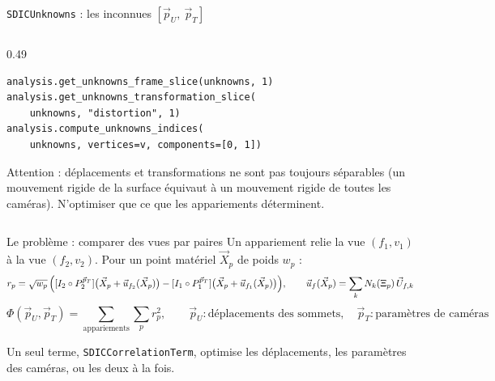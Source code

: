 \documentclass[aspectratio=169,11pt]{beamer}
\newcommand{\code}[1]{\texttt{\small #1}}
\newcommand{\cls}[1]{\textcolor{pyblue}{\texttt{#1}}}
\begin{document}
\begin{frame}[fragile]{\texttt{SDICUnknowns} : les inconnues $[\vec{p}_U,\ \vec{p}_T]$}
\begin{columns}[T]
\begin{column}{0.49\textwidth}
\begin{lstlisting}[basicstyle=\ttfamily\tiny]
analysis.get_unknowns_frame_slice(unknowns, 1)
analysis.get_unknowns_transformation_slice(
    unknowns, "distortion", 1)
analysis.compute_unknowns_indices(
    unknowns, vertices=v, components=[0, 1])
\end{lstlisting}
      \scriptsize \textcolor{pyred}{Attention :} déplacements et transformations ne
      sont pas toujours séparables (un mouvement rigide de la surface équivaut à un
      mouvement rigide de toutes les caméras). N'optimiser que ce que les
      appariements déterminent.
    \end{column}
  \end{columns}
\end{frame}

\begin{frame}{Le problème : comparer des vues par paires}
  \small
  Un \alert{appariement} relie la vue $(f_1, v_1)$ à la vue $(f_2, v_2)$. Pour un point
  matériel $\vec{X}_p$ de poids $w_p$ :
  \[
    r_p = \sqrt{w_p}\,\Bigl( [I_2 \circ P_2^{\vec{p}_T}]\bigl(\vec{X}_p + \vec{u}_{f_2}(\vec{X}_p)\bigr)
          - [I_1 \circ P_1^{\vec{p}_T}]\bigl(\vec{X}_p + \vec{u}_{f_1}(\vec{X}_p)\bigr) \Bigr),
    \qquad
    \vec{u}_f(\vec{X}_p) = \sum_k N_k(\Xi_p)\,\vec{U}_{f,k}
  \]
  \[
    \Phi(\vec{p}_U, \vec{p}_T) = \sum_{\text{appariements}} \sum_p r_p^2,
    \qquad
    \vec{p}_U : \text{déplacements des sommets},\quad
    \vec{p}_T : \text{paramètres de caméras}
  \]
 
  \centering
 
  \medskip
  \small Un seul terme, \cls{SDICCorrelationTerm}, optimise les déplacements, les
  paramètres des caméras, ou les deux à la fois.
\end{frame}
\end{document}
